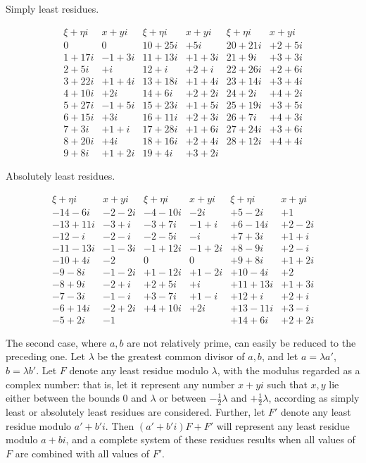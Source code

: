 \begin{center}Simply least residues.\end{center}
{\small\setlength{\arraycolsep}{3pt}
\[
\begin{array}{r|r||r|r||r|r}
\xi+\eta i&x+yi&\xi+\eta i&x+yi&\xi+\eta i&x+yi\\\hline
0&0&10+25i&+5i&20+21i&+2+5i\\
1+17i&-1+3i&11+13i&+1+3i&21+9i&+3+3i\\
2+5i&+i&12+i&+2+i&22+26i&+2+6i\\
3+22i&+1+4i&13+18i&+1+4i&23+14i&+3+4i\\
4+10i&+2i&14+6i&+2+2i&24+2i&+4+2i\\
5+27i&-1+5i&15+23i&+1+5i&25+19i&+3+5i\\
6+15i&+3i&16+11i&+2+3i&26+7i&+4+3i\\
7+3i&+1+i&17+28i&+1+6i&27+24i&+3+6i\\
8+20i&+4i&18+16i&+2+4i&28+12i&+4+4i\\
9+8i&+1+2i&19+4i&+3+2i&&
\end{array}
\]
}

%
\begin{center}Absolutely least residues.\end{center}
{\small\setlength{\arraycolsep}{3pt}
\[
\begin{array}{r|r||r|r||r|r}
\xi+\eta i&x+yi&\xi+\eta i&x+yi&\xi+\eta i&x+yi\\\hline
-14-6i&-2-2i&-4-10i&-2i&+5-2i&+1\\
-13+11i&-3+i&-3+7i&-1+i&+6-14i&+2-2i\\
-12-i&-2-i&-2-5i&-i&+7+3i&+1+i\\
-11-13i&-1-3i&-1+12i&-1+2i&+8-9i&+2-i\\
-10+4i&-2&0&0&+9+8i&+1+2i\\
-9-8i&-1-2i&+1-12i&+1-2i&+10-4i&+2\\
-8+9i&-2+i&+2+5i&+i&+11+13i&+1+3i\\
-7-3i&-1-i&+3-7i&+1-i&+12+i&+2+i\\
-6+14i&-2+2i&+4+10i&+2i&+13-11i&+3-i\\
-5+2i&-1&&&+14+6i&+2+2i
\end{array}
\]
}

The second case, where $a,b$ are not relatively prime, can easily be reduced to the preceding one. Let $\lambda$ be the greatest common divisor of $a,b$, and let $a=\lambda a'$, $b=\lambda b'$. Let $F$ denote any least residue modulo $\lambda$, with the modulus regarded as a complex number: that is, let it represent any number $x+yi$ such that $x,y$ lie either between the bounds $0$ and $\lambda$ or between $-\frac12\lambda$ and $+\frac12\lambda$, according as simply least or absolutely least residues are considered. Further, let $F'$ denote any least residue modulo $a'+b'i$. Then $(a'+b'i)F+F'$ will represent any least residue modulo $a+bi$, and a complete system of these residues results when all values of $F$ are combined with all values of $F'$.

